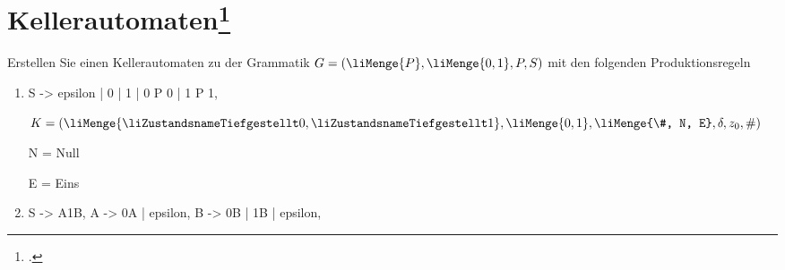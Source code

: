\documentclass{lehramt-informatik-aufgabe}
\begin{document}
\let\m=\liMenge
\let\z=\liZustandsnameTiefgestellt
\let\u=\liKellerUebergang


\section{Kellerautomaten\footcite[Seite 27]{theo:fs:2}}

Erstellen Sie einen Kellerautomaten zu der Grammatik $G = (\m{P} , \m{0,
1}, P, S)$ mit den folgenden Produktionsregeln

\begin{enumerate}

%

\item

\begin{liProduktionsRegeln}
S -> epsilon | 0 | 1 | 0 P 0 | 1 P 1,
\end{liProduktionsRegeln}

\begin{liAntwort}
$K = (\m{\z0, \z1}, \m{0, 1}, \m{\#, N, E}, \delta, z_0, \#)$

N = Null

E = Eins

\begin{center}
\end{center}

\end{liAntwort}

%

\item

\begin{liProduktionsRegeln}
S -> A1B,
A -> 0A | epsilon,
B -> 0B | 1B | epsilon,
\end{liProduktionsRegeln}
\end{enumerate}
\end{document}
